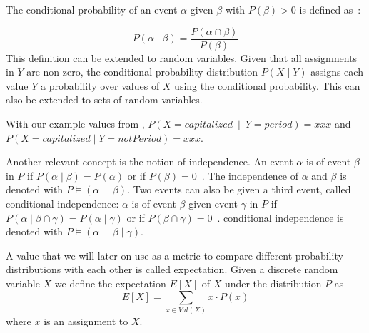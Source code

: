 \bigskip

The \gls{conditional probability} of an event $\alpha$ given $\beta$ with $P(\beta)>0$ is defined as~\cite{koller2009probabilistic}:

\begin{equation}
\label{equ:conditional-probability}
P(\alpha\mid\beta) = \frac{P(\alpha\cap\beta)}{P(\beta)}
\end{equation}
This definition can be extended to \glspl{random variable}.
Given that all assignments in $Y$ are non-zero, the \gls{conditional probability distribution} $P(X\mid Y)$ assigns each value $Y$ a probability over values of $X$ using the \gls{conditional probability}.
This can also be extended to sets of \glspl{random variable}.

With our example values from , $P(X=capitalized\ \mid\ Y=period)=xxx$ and $P(X=capitalized\mid Y=notPeriod)=xxx$.

\bigskip

Another relevant concept is the notion of \gls{independence}.
An \gls{event} $\alpha$ is  of \gls{event} $\beta$ in $P$ if $P(\alpha\mid\beta)=P(\alpha)$ or if $P(\beta)=0$~\cite{koller2009probabilistic}.
The \gls{independence} of $\alpha$ and $\beta$ is denoted with $P\models(\alpha\perp\beta)$.
Two \glspl{event} can also be  given a third \gls{event}, called \gls{conditional independence}:
$\alpha$ is  of \gls{event} $\beta$ given \gls{event} $\gamma$ in $P$ if $P(\alpha\mid\beta\cap\gamma)=P(\alpha\mid\gamma)$ or if $P(\beta\cap\gamma)=0$~\cite{koller2009probabilistic}.
\Gls{conditional independence} is denoted with $P\models(\alpha\perp\beta\mid\gamma)$.


\bigskip

A value that we will later on use as a metric to compare different \glspl{probability distribution} with each other is called \gls{expectation}.
Given a discrete \gls{random variable} $X$ we define the expectation $E[X]$ of $X$ under the distribution $P$ as~\cite{koller2009probabilistic}
\begin{equation}
  \label{equ:expectation-x}
  E[X]=\sum_{x\in Val(X)} x\cdot P(x)
\end{equation}
where $x$ is an assignment to $X$.

\bigskip

